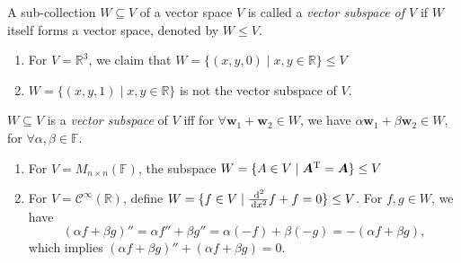 \begin{definition}
A sub-collection $W\subseteq V$ of a vector space $V$ is called a \emph{vector subspace of $V$} if $W$ itself forms a vector space, denoted by $W\le V$.
\end{definition}
\begin{example}
\begin{enumerate}
\item
For $V=\mathbb{R}^3$, we claim that $W=\{(x,y,0)\mid x,y\in\mathbb{R}\}\le V$
\item
$W=\{(x,y,1)\mid x,y\in\mathbb{R}\}$ is not the vector subspace of $V$.
\end{enumerate}
\end{example}
\begin{proposition}
$W\subseteq V$ is a \emph{vector subspace} of $V$ iff for $\forall\bm w_1+\bm w_2\in W$, we have $\alpha\bm w_1+\beta\bm w_2\in W$, for $\forall\alpha,\beta\in\mathbb{F}$.
\end{proposition}
\begin{example}
\begin{enumerate}
\item
For $V=M_{n\times n}(\mathbb{F})$, the subspace $W=\{A\in V\mid \bm A^{\mathrm T}=\bm A\}\le V$
\item
For $V=\mathcal{C}^\infty(\mathbb{R})$, define $W=\{f\in V\mid\frac{\,\mathrm{d}^2}{\,\mathrm{d} x^2}f+f=0\}\le V$. For $f,g\in W$, we have
\[
(\alpha f+\beta g)''=\alpha f''+\beta g''=\alpha(-f)+\beta(-g)=-(\alpha f+\beta g),
\]
which implies $(\alpha f+\beta g)''+(\alpha f+\beta g)=0$.
\end{enumerate}
\end{example}





%













